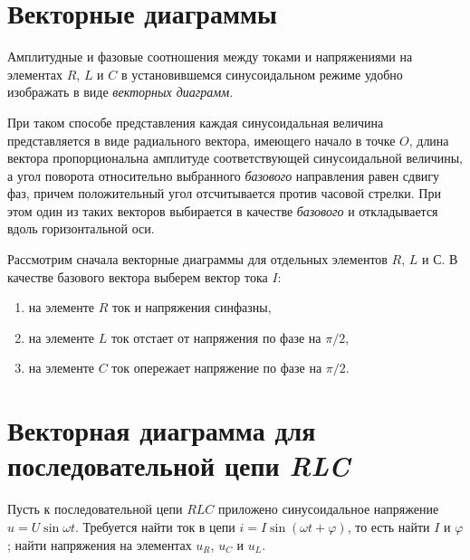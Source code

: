 \section{Векторные диаграммы}

	Амплитудные и фазовые соотношения между токами и напряжениями на элементах
    \( R \), \( L \) и \( C \) в установившемся синусоидальном режиме удобно
    изображать в виде \textit{векторных диаграмм}.
	
	При таком способе представления каждая синусоидальная величина
    представляется в виде радиального вектора, имеющего начало в точке \( O \),
    длина вектора пропорциональна амплитуде соответствующей синусоидальной
    величины, а угол поворота относительно выбранного \textit{базового}
    направления равен сдвигу фаз, причем положительный угол отсчитывается
    против часовой стрелки. При этом один из таких векторов выбирается в
    качестве \textit{базового} и откладывается вдоль горизонтальной оси.
	
	Рассмотрим сначала векторные диаграммы для отдельных элементов \( R \),
    \( L \) и \( С \). В качестве базового вектора выберем вектор тока \( I \):
	\begin{enumerate}
        \item на элементе \( R \) ток и напряжения синфазны,
        \item на элементе \( L \) ток отстает от напряжения по фазе на
            \( \pi/2 \),
        \item на элементе \( C \) ток опережает напряжение по фазе на
            \( \pi/2 \).
	\end{enumerate}

\section{Векторная диаграмма для последовательной цепи \textit{RLC}}

	Пусть к последовательной цепи \( RLC \) приложено синусоидальное напряжение
    \( u = U\sin\omega t \). Требуется найти ток в цепи
    \( i = I\sin(\omega t + \varphi) \), то есть найти \( I \) и \( \varphi \);
    найти напряжения на элементах \( u_R \), \( u_C \) и \( u_L \).
	
